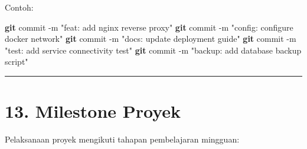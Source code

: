 \documentclass[
]{article}
\newenvironment{Shaded}{\begin{snugshade}}{\end{snugshade}}
\newcommand{\AttributeTok}[1]{\textcolor[rgb]{0.13,0.29,0.53}{#1}}
\newcommand{\FunctionTok}[1]{\textcolor[rgb]{0.13,0.29,0.53}{\textbf{#1}}}
\newcommand{\NormalTok}[1]{#1}
\newcommand{\StringTok}[1]{\textcolor[rgb]{0.31,0.60,0.02}{#1}}
\begin{document}
Contoh:

\begin{Shaded}
\begin{Highlighting}[]
\FunctionTok{git}\NormalTok{ commit }\AttributeTok{{-}m} \StringTok{"feat: add nginx reverse proxy"}
\FunctionTok{git}\NormalTok{ commit }\AttributeTok{{-}m} \StringTok{"config: configure docker network"}
\FunctionTok{git}\NormalTok{ commit }\AttributeTok{{-}m} \StringTok{"docs: update deployment guide"}
\FunctionTok{git}\NormalTok{ commit }\AttributeTok{{-}m} \StringTok{"test: add service connectivity test"}
\FunctionTok{git}\NormalTok{ commit }\AttributeTok{{-}m} \StringTok{"backup: add database backup script"}
\end{Highlighting}
\end{Shaded}

\begin{center}\rule{0.5\linewidth}{0.5pt}\end{center}

\section{13. Milestone Proyek}\label{milestone-proyek}

Pelaksanaan proyek mengikuti tahapan pembelajaran mingguan:
\end{document}
